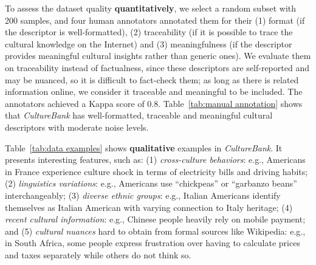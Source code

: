 \documentclass{article} %
\newcommand{\wyshi}[1]{\textcolor{red}{[#1 --Weiyan]}}
\newcommand{\dataname}{\textit{CultureBank}\xspace}
\begin{document}
To assess the dataset quality \textbf{quantitatively}, we select a random subset with 200 samples, and four human annotators annotated them for their (1) format (if the descriptor is well-formatted), (2) traceability (if it is possible to trace the cultural knowledge on the Internet) and (3) meaningfulness (if the descriptor provides meaningful cultural insights rather than generic ones). We evaluate them on traceability instead of factualness, since these descriptors are self-reported and may be nuanced, so it is difficult to fact-check them; as long as there is related information online, we consider it traceable and meaningful to be included.  The annotators achieved a Kappa score of 0.8. Table~\ref{tab:manual annotation} shows that  %
\dataname has well-formatted, traceable and meaningful cultural descriptors with moderate noise levels. %


Table~\ref{tab:data examples} shows \textbf{qualitative} examples in \dataname. It presents interesting features, such as: 
    (1) \textit{cross-culture behaviors}: e.g., Americans in France experience culture shock in terms of electricity bills and driving habits; 
    (2) \textit{linguistics variations}: e.g., Americans use ``chickpeas'' or ``garbanzo beans'' interchangeably; 
    (3) \textit{diverse ethnic groups}: e.g., Italian Americans identify themselves as Italian American with varying connection to Italy heritage; 
    (4) \textit{recent cultural information}: e.g., Chinese people heavily rely on mobile payment;
    and (5) \textit{cultural nuances} hard to obtain from formal sources like Wikipedia: e.g., in South Africa, some people express frustration over having to calculate prices and taxes separately while others do not think so.
\end{document}

